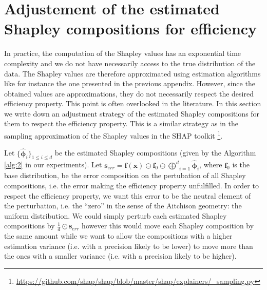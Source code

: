 \documentclass{article}
\theoremstyle{plain}
\theoremstyle{definition}
\theoremstyle{remark}
\begin{document}
\newpage
\section{Adjustement of the estimated Shapley compositions for efficiency}
\label{app:correct}

In practice, the computation of the Shapley values has an exponential time complexity and we do not have necessarily access to the true distribution of the data. The Shapley values are therefore approximated using estimation algorithms like for instance the one presented in the previous appendix. However, since the obtained values are approximations, they do not necessarily respect the desired efficiency property. This point is often overlooked in the literature. In this section we write down an adjustment strategy of the estimated Shapley compositions for them to respect the efficiency property. This is a similar strategy as in the sampling approximation of the Shapley values in the SHAP toolkit \cite{NIPS2017_7062}\footnote{\url{https://github.com/shap/shap/blob/master/shap/explainers/_sampling.py}}.

Let $\{\hat{\bm{\phi}}_i\}_{1\leq i \leq d}$ be the estimated Shapley compositions (given by the Algorithm \ref{alg:2} in our experiments). Let $\displaystyle \bm{s}_{err} = \bm{f}(\bm{x}) \ominus \bm{f}_0 \ominus \underset{i=1}{\overset{d}\bigoplus} \hat{\bm{\phi}}_i$, where $\bm{f}_0$ is the base distribution, be the error composition on the pertubation of all Shapley compositions, i.e. the error making the efficiency property unfulfilled. In order to respect the efficiency property, we want this error to be the neutral element of the perturbation, i.e. the ``zero'' in the sense of the Aitchison geometry: the uniform distribution. We could simply perturb each estimated Shapley compositions by $\frac{1}{d}\odot\bm{s}_{err}$ however this would move each Shapley composition by the same amount while we want to allow the compositions with a higher estimation variance (i.e. with a precision likely to be lower) to move more than the ones with a smaller variance (i.e. with a precision likely to be higher).
\end{document}
